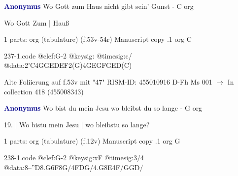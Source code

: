 \documentclass[twocolumn]{book}
\begin{document}
\newline \par \vspace{7pt} \textcolor{darkblue}{\textbf{Anonymus  }}
\newline Wo Gott zum Haus nicht gibt sein' Gunst - C
\newline org
\newline \begin{itshape}[f.53v, at left:] Wo Gott Zum | Hauß\end{itshape} 
\newline \textcolor{darkblue}{}  1 parts: org (tabulature)  (f.53v-54r)
\newline Manuscript copy
.1  org  C  
\begin{filecontents*}{237-1.code}
@clef:G-2
@keysig:
@timesig:c/
@data:2'C4GGEDEF2(G)4GEGFGED(C)
\end{filecontents*}
\newline
%

\newline Alte Foliierung auf f.53v mit "47"
\newline RISM-ID: 455010916
\newline D-Fh  Ms 001
\newline $\rightarrow$ In collection 418 (455008343)
      
\newline \par \vspace{7pt} \textcolor{darkblue}{\textbf{Anonymus  }}
\newline Wo bist du mein Jesu wo bleibst du so lange - G
\newline org
\newline \begin{itshape}[f.12v, at left:] 19. | Wo bistu mein Jesu | wo bleibstu so lange?\end{itshape} 
\newline \textcolor{darkblue}{}  1 parts: org (tabulature)  (f.12v)
\newline Manuscript copy
.1  org  G  
\begin{filecontents*}{238-1.code}
@clef:G-2
@keysig:xF
@timesig:3/4
@data:8--''D{8.G6F8G}/4FDG/4.G8E4F/GGD/
\end{filecontents*}
\newline
%
\end{document}
